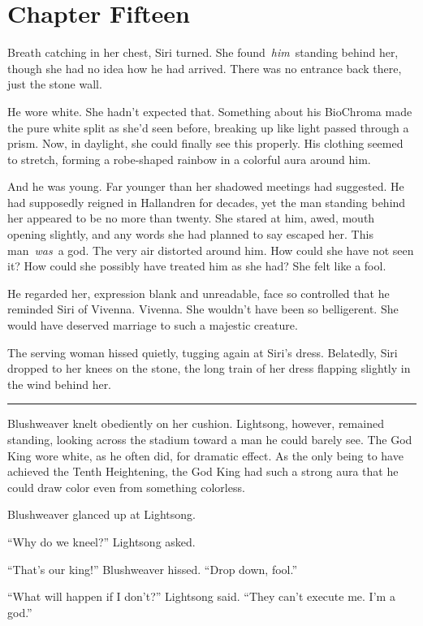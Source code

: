 \section{Chapter Fifteen}

Breath catching in her chest, Siri turned. She found~\textit{him}~standing behind her, though she had no idea how he had arrived. There was no entrance back there, just the stone wall.

He wore white. She hadn’t expected that. Something about his BioChroma made the pure white split as she’d seen before, breaking up like light passed through a prism. Now, in daylight, she could finally see this properly. His clothing seemed to stretch, forming a robe-shaped rainbow in a colorful aura around him.

And he was young. Far younger than her shadowed meetings had suggested. He had supposedly reigned in Hallandren for decades, yet the man standing behind her appeared to be no more than twenty. She stared at him, awed, mouth opening slightly, and any words she had planned to say escaped her. This man~\textit{was}~a god. The very air distorted around him. How could she have not seen it? How could she possibly have treated him as she had? She felt like a fool.

He regarded her, expression blank and unreadable, face so controlled that he reminded Siri of Vivenna. Vivenna. She wouldn’t have been so belligerent. She would have deserved marriage to such a majestic creature.

The serving woman hissed quietly, tugging again at Siri’s dress. Belatedly, Siri dropped to her knees on the stone, the long train of her dress flapping slightly in the wind behind her.

\bigskip \hrule \bigskip

Blushweaver knelt obediently on her cushion. Lightsong, however, remained standing, looking across the stadium toward a man he could barely see. The God King wore white, as he often did, for dramatic effect. As the only being to have achieved the Tenth Heightening, the God King had such a strong aura that he could draw color even from something colorless.

Blushweaver glanced up at Lightsong.

“Why do we kneel?” Lightsong asked.

“That’s our king!” Blushweaver hissed. “Drop down, fool.”

“What will happen if I don’t?” Lightsong said. “They can’t execute me. I’m a god.”

